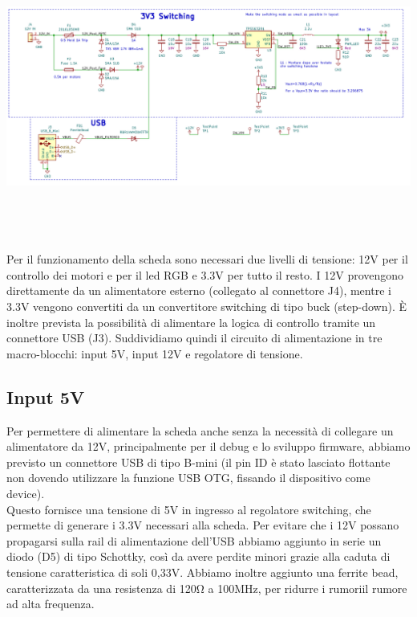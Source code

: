 \begin{center}
\includegraphics[width=6.5in,height=3.65278in]{figures/image65.png}
\captionsetup{type=figure}
\end{center}

Per il funzionamento della scheda sono necessari due livelli di tensione: 
12V per il controllo dei motori e per il led RGB e 3.3V per tutto il resto. 
I 12V provengono direttamente da un alimentatore esterno (collegato al connettore J4), 
mentre i 3.3V vengono convertiti da un convertitore switching di tipo buck (step-down). 
È inoltre prevista la possibilità di alimentare la logica di controllo tramite un connettore USB (J3). 
Suddividiamo quindi il circuito di alimentazione in tre macro-blocchi: input 5V, input 12V e regolatore di tensione.

\hypertarget{input-5V}{
\subsection{\texorpdfstring{Input 5V}{Input 5V}}\label{input-5V}}

Per permettere di alimentare la scheda anche senza la necessità di collegare un 
alimentatore da 12V, principalmente per il debug e lo sviluppo firmware, abbiamo 
previsto un connettore USB di tipo B-mini (il pin ID è stato lasciato flottante non 
dovendo utilizzare la funzione USB OTG, fissando il dispositivo come device).\\
Questo fornisce una tensione di 5V in ingresso al regolatore switching, che permette di generare i 3.3V 
necessari alla scheda. Per evitare che i 12V possano propagarsi sulla rail di alimentazione dell’USB abbiamo 
aggiunto in serie un diodo (D5) di tipo Schottky, così da avere perdite minori grazie alla caduta di tensione 
caratteristica di soli 0,33V.
Abbiamo inoltre aggiunto una ferrite bead, caratterizzata da una resistenza di 120Ω a 100MHz, per
ridurre i rumoriil rumore ad alta frequenza.

